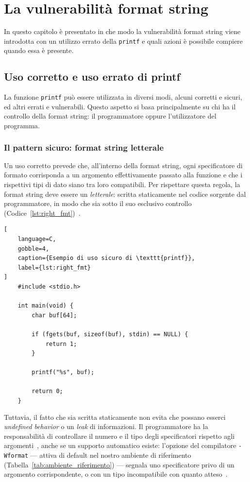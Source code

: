 \chapter{La vulnerabilità format string}\label{chapter:fmt_vuln}
In questo capitolo è presentato in che modo la vulnerabilità format string viene introdotta con un utilizzo errato della \texttt{printf} e quali azioni è possibile compiere quando essa è presente.


\section{Uso corretto e uso errato di printf}\label{sec:printf_right_wrong}
La funzione \texttt{printf} può essere utilizzata in diversi modi, alcuni corretti e sicuri, ed altri errati e vulnerabili.
Questo aspetto si basa principalmente su chi ha il controllo della format string: il programmatore oppure l'utilizzatore del programma.

\subsection{Il pattern sicuro: format string letterale}\label{subsec:right_fmt}
Un uso corretto prevede che, all'interno della format string, ogni specificatore di formato corrisponda a un argomento effettivamente passato alla funzione e che i rispettivi tipi di dato siano tra loro compatibili.
Per rispettare questa regola, la format string deve essere un \emph{letterale}: scritta staticamente nel codice sorgente dal programmatore, in modo che sia sotto il suo esclusivo controllo (Codice~\ref{lst:right_fmt})~\cite{seicertc2016}.
\begin{lstlisting}[
    language=C,
    gobble=4,
    caption={Esempio di uso sicuro di \texttt{printf}},
    label={lst:right_fmt}
]
    #include <stdio.h>

    int main(void) {
        char buf[64];
        
        if (fgets(buf, sizeof(buf), stdin) == NULL) {
            return 1;
        }
        
        printf("%s", buf);

        return 0;
    }
\end{lstlisting}

Tuttavia, il fatto che sia scritta staticamente non evita che possano esserci \emph{undefined behavior} o un \emph{leak} di informazioni. Il programmatore ha la responsabilità di controllare il numero e il tipo degli specificatori rispetto agli argomenti~\cite{seicertc2016}, anche se un supporto automatico esiste: l'opzione del compilatore \texttt{-Wformat} --- attiva di default nel nostro ambiente di riferimento (Tabella~\ref{tab:ambiente_riferimento}) --- segnala uno specificatore privo di un argomento corrispondente, o con un tipo incompatibile con quanto atteso~\cite{gccwopts}.

